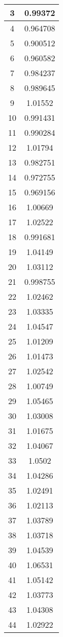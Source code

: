 \begin{table}[h]
\begin{subtable}[h]{2in}
{\begin{tabular}{|c|c|}
3	&	0.99372	\\	\hline
4	&	0.964708	\\	\hline
5	&	0.900512	\\	\hline
6	&	0.960582	\\	\hline
7	&	0.984237	\\	\hline
8	&	0.989645	\\	\hline
9	&	1.01552	\\	\hline
10	&	0.991431	\\	\hline
11	&	0.990284	\\	\hline
12	&	1.01794	\\	\hline
13	&	0.982751	\\	\hline
14	&	0.972755	\\	\hline
15	&	0.969156	\\	\hline
16	&	1.00669	\\	\hline
17	&	1.02522	\\	\hline
18	&	0.991681	\\	\hline
19	&	1.04149	\\	\hline
20	&	1.03112	\\	\hline
21	&	0.998755	\\	\hline
22	&	1.02462	\\	\hline
23	&	1.03335	\\	\hline
24	&	1.04547	\\	\hline
25	&	1.01209	\\	\hline
26	&	1.01473	\\	\hline
27	&	1.02542	\\	\hline
28	&	1.00749	\\	\hline
29	&	1.05465	\\	\hline
30	&	1.03008	\\	\hline
31	&	1.01675	\\	\hline
32	&	1.04067	\\	\hline
33	&	1.0502	\\	\hline
34	&	1.04286	\\	\hline
35	&	1.02491	\\	\hline
36	&	1.02113	\\	\hline
37	&	1.03789	\\	\hline
38	&	1.03718	\\	\hline
39	&	1.04539	\\	\hline
40	&	1.06531	\\	\hline
41	&	1.05142	\\	\hline
42	&	1.03773	\\	\hline
43	&	1.04308	\\	\hline
44	&	1.02922	\\	\hline

\end{tabular}}
\end{subtable}
\end{table}
